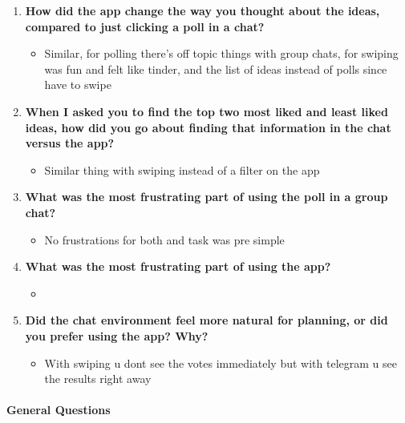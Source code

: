 \documentclass[12pt,a4paper]{article}
\begin{document}
\begin{enumerate}
    \item \textbf{How did the app change the way you thought about the ideas, compared to just clicking a poll in a chat?}
    
    \begin{itemize}
        \item Similar, for polling there's off topic things with group chats, for swiping was fun and felt like tinder, and the list of ideas instead of polls since have to swipe
    \end{itemize}
    
    \item \textbf{When I asked you to find the top two most liked and least liked ideas, how did you go about finding that information in the chat versus the app?}
    
    \begin{itemize}
        \item Similar thing with swiping instead of a filter on the app
    \end{itemize}
    
    \item \textbf{What was the most frustrating part of using the poll in a group chat?}
    
    \begin{itemize}
        \item No frustrations for both and task was pre simple
    \end{itemize}
    
    \item \textbf{What was the most frustrating part of using the app?}
    
    \begin{itemize}
        \item [N/A]
    \end{itemize}
    
    \item \textbf{Did the chat environment feel more natural for planning, or did you prefer using the app? Why?}
    
    \begin{itemize}
        \item With swiping u dont see the votes immediately but with telegram u see the results right away
    \end{itemize}
\end{enumerate}


\paragraph{General Questions}
\end{document}
